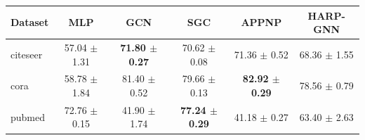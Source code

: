 \begin{tabular}{lccccc}
\toprule
Dataset & MLP & GCN & SGC & APPNP & HARP-GNN \\
\midrule
citeseer & 57.04 $\pm$ 1.31 & \textbf{71.80 $\pm$ 0.27} & 70.62 $\pm$ 0.08 & 71.36 $\pm$ 0.52 & 68.36 $\pm$ 1.55 \\
cora & 58.78 $\pm$ 1.84 & 81.40 $\pm$ 0.52 & 79.66 $\pm$ 0.13 & \textbf{82.92 $\pm$ 0.29} & 78.56 $\pm$ 0.79 \\
pubmed & 72.76 $\pm$ 0.15 & 41.90 $\pm$ 1.74 & \textbf{77.24 $\pm$ 0.29} & 41.18 $\pm$ 0.27 & 63.40 $\pm$ 2.63 \\
\bottomrule
\end{tabular}

